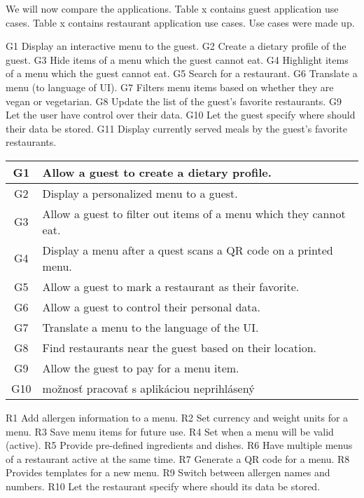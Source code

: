 We will now compare the applications.
Table x contains guest application use cases.
Table x contains restaurant application use cases.
Use cases were made up.

G1 Display an interactive menu to the guest.
G2 Create a dietary profile of the guest.
G3 Hide items of a menu which the guest cannot eat.
G4 Highlight items of a menu which the guest cannot eat.
G5 Search for a restaurant.
G6 Translate a menu (to language of UI).
G7 Filters menu items based on whether they are vegan or vegetarian.
G8 Update the list of the guest's favorite restaurants.
G9 Let the user have control over their data.
G10 Let the guest specify where should their data be stored.
G11 Display currently served meals by the guest's favorite restaurants.

\begin{center}
  \begin{tabular}{| c | l |}
    \hline
    G1 & Allow a guest to create a dietary profile. \\
    \hline
    G2 & Display a personalized menu to a guest. \\
    \hline
    G3 & Allow a guest to filter out items of a menu which they cannot eat. \\
    \hline
    G4 & Display a menu after a quest scans a QR code on a printed menu. \\
    \hline
    G5 & Allow a guest to mark a restaurant as their favorite. \\
    \hline
    G6 & Allow a guest to control their personal data. \\
    \hline
    G7 & Translate a menu to the language of the UI. \\
    \hline
    G8 & Find restaurants near the guest based on their location. \\
    \hline
    G9 & Allow the guest to pay for a menu item. \\ %
    \hline
    G10 & možnosť pracovať s aplikáciou neprihlásený \\
    \hline
  \end{tabular}
  \newline
\end{center}

R1 Add allergen information to a menu.
R2 Set currency and weight units for a menu.
R3 Save menu items for future use.
R4 Set when a menu will be valid (active). 
R5 Provide pre-defined ingredients and dishes.
R6 Have multiple menus of a restaurant active at the same time.
R7 Generate a QR code for a menu.
R8 Provides templates for a new menu. 
R9 Switch between allergen names and numbers.
R10 Let the restaurant specify where should its data be stored.

